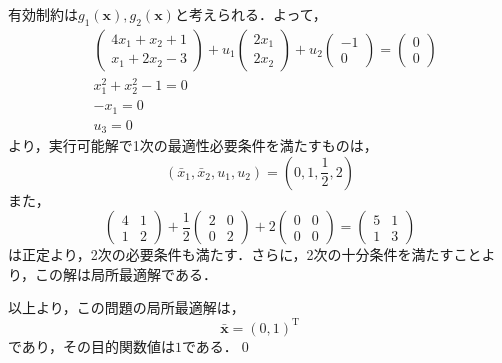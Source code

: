 \documentclass{jsreport}
\begin{document}
有効制約は$g_1(\bm{x}), g_2(\bm{x})$と考えられる．よって，
\begin{align}
  &\left(
  \begin{array}{c}
    4x_1 + x_2 + 1 \\
    x_1 + 2x_2 - 3
  \end{array}
  \right) + u_1\left(
  \begin{array}{c}
    2x_1 \\
    2x_2
  \end{array}
  \right) + u_2\left(
  \begin{array}{c}
    -1 \\
    0
  \end{array}
  \right) = \left(
  \begin{array}{c}
    0 \\
    0
  \end{array}
  \right) \nonumber \\
  &x_1^2 + x_2^2 - 1 = 0 \nonumber \\
  &-x_1 = 0 \nonumber \\
  &u_3 = 0 \nonumber
\end{align}
より，実行可能解で1次の最適性必要条件を満たすものは，
\begin{equation}
  (\bar{x}_1, \bar{x}_2, u_1, u_2) = \left(0, 1, \frac{1}{2}, 2 \right) \nonumber
\end{equation}
また，
\begin{equation}
  \left(
  \begin{array}{cc}
    4 & 1 \\
    1 & 2
  \end{array}
  \right) + \frac{1}{2} \left(
  \begin{array}{cc}
    2 & 0 \\
    0 & 2
  \end{array}
  \right) + 2 \left(
  \begin{array}{cc}
    0 & 0 \\
    0 & 0
  \end{array}
  \right) = \left(
  \begin{array}{cc}
    5 & 1 \\
    1 & 3
  \end{array}
  \right) \nonumber
\end{equation}
は正定より，2次の必要条件も満たす．さらに，2次の十分条件を満たすことより，この解は局所最適解である．

以上より，この問題の局所最適解は，
\begin{equation}
  \bar{\bm{x}} = \left(0, 1\right)^{\mathrm{T}} \nonumber
\end{equation}
であり，その目的関数値は$1$である．\qed
\end{document}

